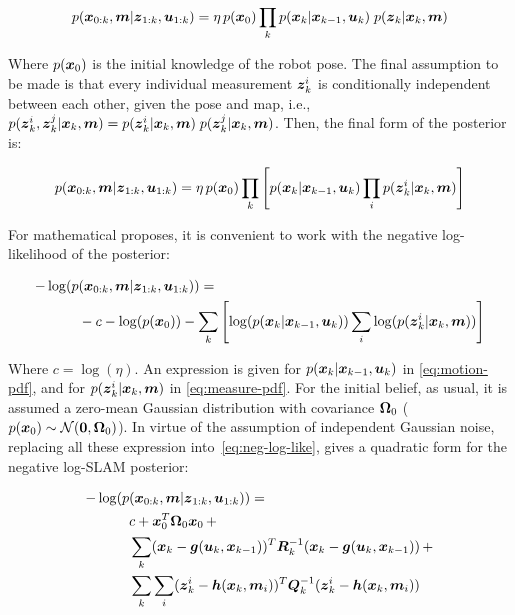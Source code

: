 \begin{equation}
p(\boldsymbol{x}_{0:k},\boldsymbol{m}|\boldsymbol{z}_{1:k},\boldsymbol{u}_{1:k}) = 
\eta\, p(\boldsymbol{x}_0) \prod_{k} p(\boldsymbol{x}_k|\boldsymbol{x}_{k-1},\boldsymbol{u}_k)\;p(\boldsymbol{z}_k|\boldsymbol{x}_k,\boldsymbol{m})
\end{equation}

Where $p(\boldsymbol{x}_0)$ is the initial knowledge of the robot pose. The final assumption to be made is that every individual measurement $\boldsymbol{z}_k^i$ is conditionally independent between each other, given the pose and map, i.e., $p(\boldsymbol{z}_k^i,\boldsymbol{z}_k^j|\boldsymbol{x}_k,\boldsymbol{m}) = p(\boldsymbol{z}_k^i|\boldsymbol{x}_k,\boldsymbol{m})\; p(\boldsymbol{z}_k^j|\boldsymbol{x}_k,\boldsymbol{m})$. Then, the final form of the posterior is: 
  
\begin{equation}
p(\boldsymbol{x}_{0:k},\boldsymbol{m}|\boldsymbol{z}_{1:k},\boldsymbol{u}_{1:k}) = 
\eta\, p(\boldsymbol{x}_0) \prod_{k}\left[ p(\boldsymbol{x}_k|\boldsymbol{x}_{k-1},\boldsymbol{u}_k)\prod_{i}p(\boldsymbol{z}_k^i|\boldsymbol{x}_k,\boldsymbol{m})\right] 
\label{eq:posterior}
\end{equation} 

\noindent 
For mathematical proposes, it is convenient to work with the negative log-likelihood of the posterior:

\begin{equation}
\begin{split}
-\log(p&(\boldsymbol{x}_{0:k},\boldsymbol{m}|\boldsymbol{z}_{1:k},\boldsymbol{u}_{1:k})) =\\ 
&-c - \log(p(\boldsymbol{x}_0)) - \sum_{k}\left[ \log(p(\boldsymbol{x}_k|\boldsymbol{x}_{k-1},\boldsymbol{u}_k))\sum_{i}\log(p(\boldsymbol{z}_k^i|\boldsymbol{x}_k,\boldsymbol{m}))\right] 
\end{split}
\label{eq:neg-log-like}
\end{equation}

Where $c=\log(\eta)$. An expression is given for $p(\boldsymbol{x}_k|\boldsymbol{x}_{k-1},\boldsymbol{u}_k)$ in \eqref{eq:motion-pdf}, and for $p(\boldsymbol{z}_k^i|\boldsymbol{x}_k,\boldsymbol{m})$ in \eqref{eq:measure-pdf}. For the initial belief, as usual, it is assumed a zero-mean Gaussian distribution with covariance $\boldsymbol{\Omega}_0$ ($p(\boldsymbol{x}_0)\sim\mathcal{N}(\boldsymbol{0},\boldsymbol{\Omega}_0)$). In virtue of the assumption of independent Gaussian noise, replacing all these expression into~\eqref{eq:neg-log-like}, gives a quadratic form for the negative log-SLAM posterior:

\begin{equation}
\begin{split}
-\log(p&(\boldsymbol{x}_{0:k},\boldsymbol{m}|\boldsymbol{z}_{1:k},\boldsymbol{u}_{1:k})) =\\ 
&c+\boldsymbol{x}_0^T \boldsymbol{\Omega}_0 \boldsymbol{x}_0\,+\\
&\sum_{k} (\boldsymbol{x}_k-\boldsymbol{g}(\boldsymbol{u}_k,\boldsymbol{x}_{k-1}))^T
\boldsymbol{R}_k^{-1}(\boldsymbol{x}_k-\boldsymbol{g}(\boldsymbol{u}_k,\boldsymbol{x}_{k-1}))\,+\\
&\sum_{k}\sum_{i}(\boldsymbol{z}_k^i-\boldsymbol{h}(\boldsymbol{x}_k,\boldsymbol{m}_i))^T
\boldsymbol{Q}_k^{-1}(\boldsymbol{z}_k^i-\boldsymbol{h}(\boldsymbol{x}_k,\boldsymbol{m}_i))
\label{eq:quadratic}
\end{split}
\end{equation}

